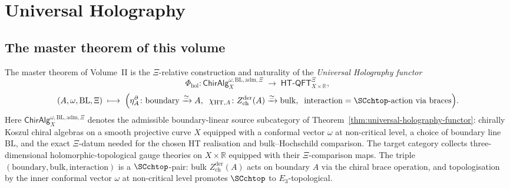 \chapter{Universal Holography}
\label{ch:programme-climax-platonic}

\providecommand{\Phihol}{\Phi_{\mathrm{hol}}}
\providecommand{\HTQFTclimax}{\mathsf{HT\text{-}QFT}}
\providecommand{\ChirAlgclimax}{\mathsf{ChirAlg}}
\providecommand{\Vir}{\mathrm{Vir}}

\section{The master theorem of this volume}
\label{sec:climax-master-theorem}

The master theorem of Volume~II is the \(\Xi\)-relative construction
and naturality of the \emph{Universal Holography functor}
\[
 \Phihol\colon \ChirAlgclimax^{\omega, \mathrm{BL,adm},\Xi}_{X}
 \;\longrightarrow\;
 \HTQFTclimax^{\Xi}_{X \times \mathbb{R}},
\]
\[
 (A,\omega,\mathrm{BL},\Xi) \;\longmapsto\;
 \Bigl(
 \eta^\partial_A\colon\mathrm{boundary}\xrightarrow{\simeq} A,\;\;
 \chi_{\mathrm{HT},A}\colon
 Z^{\mathrm{der}}_{\mathrm{ch}}(A)\xrightarrow{\simeq}\mathrm{bulk},\;\;
 \mathrm{interaction} = \SCchtop\text{-action via braces}
 \Bigr).
\]
Here \(\ChirAlgclimax^{\omega,\mathrm{BL,adm},\Xi}_X\) denotes the
admissible boundary-linear source subcategory of
Theorem~\ref{thm:universal-holography-functor}: chirally Koszul
chiral algebras on a
smooth projective curve $X$ equipped with a conformal vector $\omega$
at non-critical level, a choice of boundary line $\mathrm{BL}$, and
the exact \(\Xi\)-datum needed for the chosen HT realisation and
bulk--Hochschild comparison.
The target category collects three-dimensional holomorphic-topological
gauge theories on $X \times \mathbb{R}$ equipped with their
\(\Xi\)-comparison maps. The triple
$(\mathrm{boundary},\mathrm{bulk},\mathrm{interaction})$ is a
$\SCchtop$-pair: bulk $Z^{\mathrm{der}}_{\mathrm{ch}}(A)$ acts on
boundary $A$ via the chiral brace operation, and topologisation by
the inner conformal vector $\omega$ at non-critical level promotes
$\SCchtop$ to $E_{3}$-topological.

